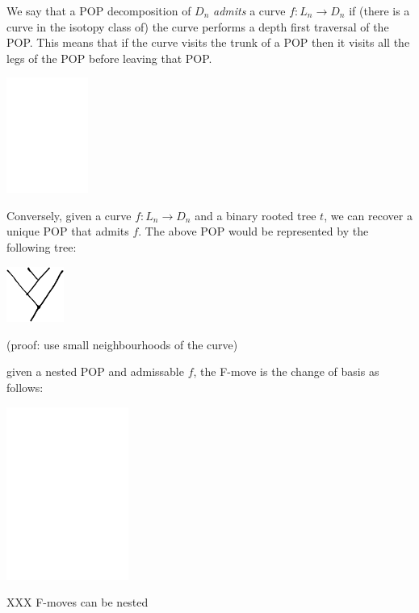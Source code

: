 \documentclass[11pt,a4paper]{article}
\begin{document}
We say that a POP decomposition of $D_n$
{\it admits} a curve $f:L_n\to D_n$
if (there is a curve in the isotopy class of)
the curve performs a depth first traversal of the POP.
This means that if the curve visits the trunk of a POP
then it visits all the legs of the POP before leaving that POP.

\begin{center}
\includegraphics[width=0.2\textwidth]{POP-2.eps}
\end{center}

Conversely, given a curve $f:L_n\to D_n$
and a binary rooted tree $t$,
we can recover a unique POP that admits $f$.
The above POP would be represented by the following tree:

\begin{center}
\includegraphics[width=0.14\textwidth]{POP-3.eps}
\end{center}

(proof: use small neighbourhoods of the curve)

 given a nested POP and admissable $f$,
the F-move is the change of basis as follows:

\begin{center}
\includegraphics[width=0.3\textwidth]{POP-4.eps}
\end{center}

XXX F-moves can be nested
\end{document}

